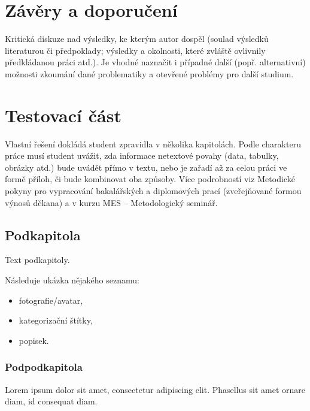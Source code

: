 

\section{Závěry a doporučení}


Kritická diskuze nad výsledky, ke kterým autor dospěl (soulad výsledků  literaturou či předpoklady;
výsledky a okolnosti, které zvláště ovlivnily předkládanou práci atd.). Je vhodné naznačit i případné další
(popř. alternativní) možnosti zkoumání dané problematiky a otevřené problémy pro další studium.

\section{Testovací část}


Vlastní řešení dokládá student zpravidla v několika kapitolách. Podle charakteru práce musí student uvážit, zda informace
netextové povahy (data, tabulky, obrázky atd.) bude uvádět přímo v textu, nebo je zařadí až za celou práci ve formě příloh, či bude kombinovat oba způsoby.
Více podrobností viz Metodické pokyny pro vypracování bakalářských a diplomových prací (zveřejňované formou výnosů děkana)
a v kurzu MES – Metodologický seminář.

	\subsection{Podkapitola}

	Text podkapitoly.

	Následuje ukázka nějakého seznamu:
	\begin{itemize}
		\item fotografie/avatar,
		\item kategorizační štítky,
		\item popisek.
	\end{itemize}

		\subsubsection{Podpodkapitola}

		Lorem ipsum dolor sit amet, consectetur adipiscing elit. Phasellus sit amet ornare diam, id consequat diam.

